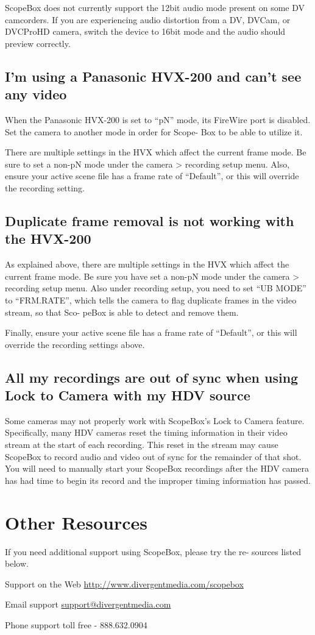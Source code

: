 \documentclass[10,letterpaper,]{report}
\begin{document}
ScopeBox does not currently support the 12bit audio mode present on some
DV camcorders. If you are experiencing audio distortion from a DV,
DVCam, or DVCProHD camera, switch the device to 16bit mode and the audio
should preview correctly.

\section{I'm using a Panasonic HVX-200 and can't see any video}

When the Panasonic HVX-200 is set to ``pN'' mode, its FireWire port is
disabled. Set the camera to another mode in order for Scope- Box to be
able to utilize it.

There are multiple settings in the HVX which affect the current frame
mode. Be sure to set a non-pN mode under the camera \textgreater{}
recording setup menu. Also, ensure your active scene file has a frame
rate of ``Default'', or this will override the recording setting.

\section{Duplicate frame removal is not working with the HVX-200}

As explained above, there are multiple settings in the HVX which affect
the current frame mode. Be sure you have set a non-pN mode under the
camera \textgreater{} recording setup menu. Also under recording setup,
you need to set ``UB MODE'' to ``FRM.RATE'', which tells the camera to
flag duplicate frames in the video stream, so that Sco- peBox is able to
detect and remove them.

Finally, ensure your active scene file has a frame rate of ``Default'',
or this will override the recording settings above.

\section{All my recordings are out of sync when using Lock to Camera
with my HDV source}

Some cameras may not properly work with ScopeBox's Lock to Camera
feature. Specifically, many HDV cameras reset the timing information in
their video stream at the start of each recording. This reset in the
stream may cause ScopeBox to record audio and video out of sync for the
remainder of that shot. You will need to manually start your ScopeBox
recordings after the HDV camera has had time to begin its record and the
improper timing information has passed.

\chapter{Other Resources}

If you need additional support using ScopeBox, please try the re-
sources listed below.

Support on the Web \url{http://www.divergentmedia.com/scopebox}

Email support
\href{mailto:support@divergentmedia.com}{support@divergentmedia.com}

Phone support toll free - 888.632.0904
\end{document}
